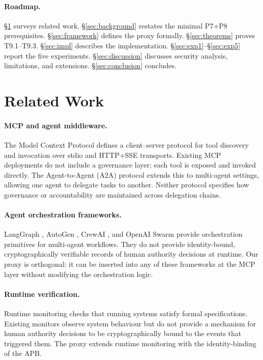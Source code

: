 \documentclass[11pt]{article}
\begin{document}
\paragraph{Roadmap.}
\S\ref{sec:related} surveys related work.
\S\ref{sec:background} restates the minimal P7+P8 prerequisites.
\S\ref{sec:framework} defines the proxy formally.
\S\ref{sec:theorems} proves T9.1--T9.3.
\S\ref{sec:impl} describes the implementation.
\S\ref{sec:exp1}--\S\ref{sec:exp5} report the five experiments.
\S\ref{sec:discussion} discusses security analysis, limitations,
and extensions.
\S\ref{sec:conclusion} concludes.

\section{Related Work}
\label{sec:related}

\paragraph{MCP and agent middleware.}
The Model Context Protocol \citep{anthropic2024mcp} defines a
client--server protocol for tool discovery and invocation over stdio
and HTTP+SSE transports. Existing MCP deployments do not include a
governance layer; each tool is exposed and invoked directly. The
Agent-to-Agent (A2A) protocol \citep{google2025a2a} extends this to
multi-agent settings, allowing one agent to delegate tasks to another.
Neither protocol specifies how governance or accountability are
maintained across delegation chains.

\paragraph{Agent orchestration frameworks.}
LangGraph \citep{langgraph2024}, AutoGen \citep{autogen2023}, CrewAI
\citep{crewai2024}, and OpenAI Swarm \citep{openai2024swarm} provide
orchestration primitives for multi-agent workflows. They do not provide
identity-bound, cryptographically verifiable records of human authority
decisions at runtime. Our proxy is orthogonal: it can be inserted into
any of these frameworks at the MCP layer without modifying the
orchestration logic.

\paragraph{Runtime verification.}
Runtime monitoring \citep{leucker2009brief,havelund2004efficient,%
falcone2011tutorial} checks that running systems satisfy formal
specifications. Existing monitors observe system behaviour but do not
provide a mechanism for human authority decisions to be cryptographically
bound to the events that triggered them. The proxy extends runtime
monitoring with the identity-binding of the APB.
\end{document}
